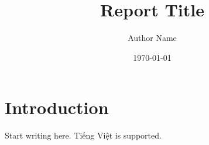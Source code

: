 \documentclass[11pt,a4paper]{article}
\title{Report Title}
\author{Author Name}
\date{\today}
\begin{document}
\maketitle

\section{Introduction}

Start writing here. Tiếng Việt is supported.
\end{document}
